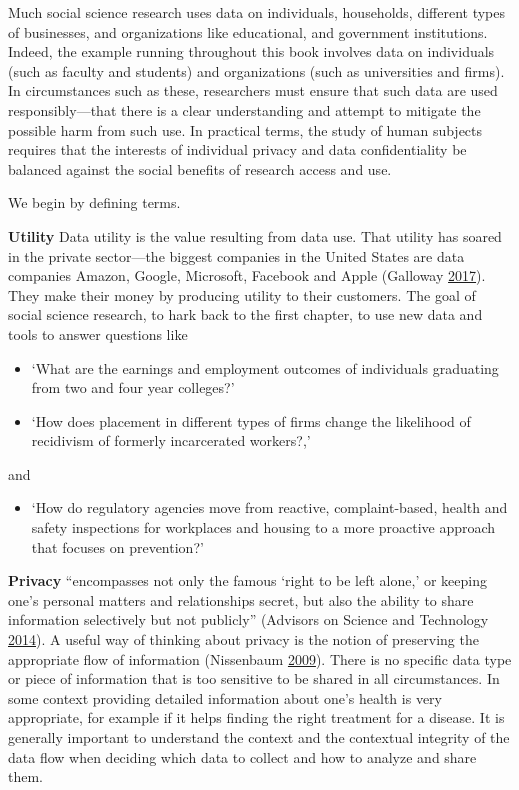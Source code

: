 \documentclass[]{krantz}
\providecommand{\tightlist}{%
  \setlength{\itemsep}{0pt}\setlength{\parskip}{0pt}}
\begin{document}
Much social science research uses data on individuals, households,
different types of businesses, and organizations like educational, and
government institutions. Indeed, the example running throughout this
book involves data on individuals (such as faculty and students) and
organizations (such as universities and firms). In circumstances such as
these, researchers must ensure that such data are used
responsibly---that there is a clear understanding and attempt to
mitigate the possible harm from such use. In practical terms, the study
of human subjects requires that the interests of individual privacy and
data confidentiality be balanced against the social benefits of research
access and use.

We begin by defining terms.

\textbf{Utility} Data utility is the value resulting from data use. That
utility has soared in the private sector---the biggest companies in the
United States are data companies Amazon, Google, Microsoft, Facebook and
Apple (Galloway \protect\hyperlink{ref-galloway2017four}{2017}). They
make their money by producing utility to their customers. The goal of
social science research, to hark back to the first chapter, to use new
data and tools to answer questions like

\begin{itemize}
\item
  `What are the earnings and employment outcomes of individuals
  graduating from two and four year colleges?'
\item
  `How does placement in different types of firms change the likelihood
  of recidivism of formerly incarcerated workers?,'
\end{itemize}

and

\begin{itemize}
\tightlist
\item
  `How do regulatory agencies move from reactive, complaint-based,
  health and safety inspections for workplaces and housing to a more
  proactive approach that focuses on prevention?'
\end{itemize}

\textbf{Privacy} ``encompasses not only the famous `right to be left
alone,' or keeping one's personal matters and relationships secret, but
also the ability to share information selectively but not publicly''
(Advisors on Science and Technology
\protect\hyperlink{ref-house2014big}{2014}). A useful way of thinking
about privacy is the notion of preserving the appropriate flow of
information (Nissenbaum \protect\hyperlink{ref-nissenbaum2009}{2009}).
There is no specific data type or piece of information that is too
sensitive to be shared in all circumstances. In some context providing
detailed information about one's health is very appropriate, for example
if it helps finding the right treatment for a disease. It is generally
important to understand the context and the contextual integrity of the
data flow when deciding which data to collect and how to analyze and
share them.
\end{document}
